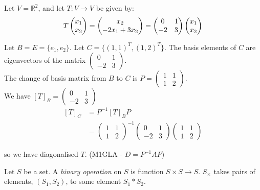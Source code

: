 \documentclass[10pt]{scrartcl}
\begin{document}
\begin{example} Let $V = \mathbb{R}^2$, and let $T: V \to V$ be given by:
\[
T\Spvek{x_1;x_2} = 
\Spvek[c]{x_2; -2x_1 + 3x_2}
= 
\begin{pmatrix}
0 & 1 \\ -2 & 3
\end{pmatrix}
\Spvek{x_1;x_2}
\]

Let $B = E = \{e_1,e_2\}$. Let $C = \{(1,1)^T,(1,2)^T\}$. The basis elements of $C$ are eigenvectors of the matrix $\begin{pmatrix}
0 & 1 \\ -2 & 3
\end{pmatrix}$. \\

The change of basis matrix from $B$ to $C$ is $P = \begin{pmatrix}
 1 & 1\\ 1 & 2
 \end{pmatrix}$.\\
 
 We have $[T]_B = \begin{pmatrix}
 0 & 1 \\ -2 & 3
 \end{pmatrix}$\\
 
 \[
 \begin{aligned}
 [T]_C &= P^{-1}[T]_BP\\
 &= \begin{pmatrix}
 1 & 1 \\ 1 & 2
 \end{pmatrix}^{-1}
 \begin{pmatrix}
 0 & 1 \\ -2 & 3
 \end{pmatrix}
\begin{pmatrix}
 1 & 1\\ 1 & 2
 \end{pmatrix}
 \end{aligned}\]
 
 so we have diagonalised $T$. (M1GLA - $D = P^{-1}AP$)
 \end{example}
 







 \setcounter{equation}{54}

 
 Let  $S$ be a set. A \emph{binary operation} on $S$ is function $S \times S \to S$. $S_{\times}$ takes pairs of elements, $(S_1,S_2)$, to some element $S_1 * S_2$.\\
 
\end{document}
